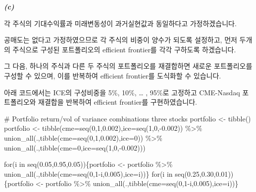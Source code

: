 \documentclass[
  letterpaper,
  DIV=11,
  numbers=noendperiod]{scrreprt}
\newenvironment{Shaded}{\begin{snugshade}}{\end{snugshade}}
\newcommand{\AttributeTok}[1]{\textcolor[rgb]{0.40,0.45,0.13}{#1}}
\newcommand{\CommentTok}[1]{\textcolor[rgb]{0.37,0.37,0.37}{#1}}
\newcommand{\ControlFlowTok}[1]{\textcolor[rgb]{0.00,0.23,0.31}{#1}}
\newcommand{\DecValTok}[1]{\textcolor[rgb]{0.68,0.00,0.00}{#1}}
\newcommand{\FloatTok}[1]{\textcolor[rgb]{0.68,0.00,0.00}{#1}}
\newcommand{\FunctionTok}[1]{\textcolor[rgb]{0.28,0.35,0.67}{#1}}
\newcommand{\NormalTok}[1]{\textcolor[rgb]{0.00,0.23,0.31}{#1}}
\newcommand{\OtherTok}[1]{\textcolor[rgb]{0.00,0.23,0.31}{#1}}
\newcommand{\SpecialCharTok}[1]{\textcolor[rgb]{0.37,0.37,0.37}{#1}}
\begin{document}
\textbf{\emph{(c)}}

각 주식의 기대수익률과 미래변동성이 과거실현값과 동일하다고
가정하겠습니다.

공매도는 없다고 가정하였으므로 각 주식의 비중이 양수가 되도록 설정하고,
먼저 두개의 주식으로 구성된 포트폴리오의 efficient frontier를 각각
구하도록 하겠습니다.

그 다음, 하나의 주식과 다른 두 주식의 포트폴리오를 재결합하면 새로운
포트폴리오를 구성할 수 있으며, 이를 반복하여 efficient frontier를
도식화할 수 있습니다.

아래 코드에서는 ICE의 구성비중을 5\%, 10\%, \ldots{} , 95\%로 고정하고
CME-Nasdaq 포트폴리오와 재결합을 반복하여 efficient frontier를
구현하였습니다.

\begin{Shaded}
\begin{Highlighting}[]
\CommentTok{\# Portfolio return/vol of variance combinations three stocks}
\NormalTok{portfolio }\OtherTok{\textless{}{-}} \FunctionTok{tibble}\NormalTok{()}
\NormalTok{portfolio }\OtherTok{\textless{}{-}} \FunctionTok{tibble}\NormalTok{(}\AttributeTok{cme=}\FunctionTok{seq}\NormalTok{(}\DecValTok{0}\NormalTok{,}\DecValTok{1}\NormalTok{,}\FloatTok{0.002}\NormalTok{),}\AttributeTok{ice=}\FunctionTok{seq}\NormalTok{(}\DecValTok{1}\NormalTok{,}\DecValTok{0}\NormalTok{,}\SpecialCharTok{{-}}\FloatTok{0.002}\NormalTok{)) }\SpecialCharTok{\%\textgreater{}\%} 
  \FunctionTok{union\_all}\NormalTok{(.,}\FunctionTok{tibble}\NormalTok{(}\AttributeTok{cme=}\FunctionTok{seq}\NormalTok{(}\DecValTok{0}\NormalTok{,}\DecValTok{1}\NormalTok{,}\FloatTok{0.002}\NormalTok{),}\AttributeTok{ice=}\DecValTok{0}\NormalTok{)) }\SpecialCharTok{\%\textgreater{}\%} 
  \FunctionTok{union\_all}\NormalTok{(.,}\FunctionTok{tibble}\NormalTok{(}\AttributeTok{cme=}\DecValTok{0}\NormalTok{,}\AttributeTok{ice=}\FunctionTok{seq}\NormalTok{(}\DecValTok{1}\NormalTok{,}\DecValTok{0}\NormalTok{,}\SpecialCharTok{{-}}\FloatTok{0.002}\NormalTok{)))}

\ControlFlowTok{for}\NormalTok{(i }\ControlFlowTok{in} \FunctionTok{seq}\NormalTok{(}\FloatTok{0.05}\NormalTok{,}\FloatTok{0.95}\NormalTok{,}\FloatTok{0.05}\NormalTok{))\{portfolio }\OtherTok{\textless{}{-}}\NormalTok{ portfolio }\SpecialCharTok{\%\textgreater{}\%}
  \FunctionTok{union\_all}\NormalTok{(.,}\FunctionTok{tibble}\NormalTok{(}\AttributeTok{cme=}\FunctionTok{seq}\NormalTok{(}\DecValTok{0}\NormalTok{,}\DecValTok{1}\SpecialCharTok{{-}}\NormalTok{i,}\FloatTok{0.005}\NormalTok{),}\AttributeTok{ice=}\NormalTok{i))\}}
\ControlFlowTok{for}\NormalTok{(i }\ControlFlowTok{in} \FunctionTok{seq}\NormalTok{(}\FloatTok{0.25}\NormalTok{,}\FloatTok{0.30}\NormalTok{,}\FloatTok{0.01}\NormalTok{))\{portfolio }\OtherTok{\textless{}{-}}\NormalTok{ portfolio }\SpecialCharTok{\%\textgreater{}\%}
  \FunctionTok{union\_all}\NormalTok{(.,}\FunctionTok{tibble}\NormalTok{(}\AttributeTok{cme=}\FunctionTok{seq}\NormalTok{(}\DecValTok{0}\NormalTok{,}\DecValTok{1}\SpecialCharTok{{-}}\NormalTok{i,}\FloatTok{0.005}\NormalTok{),}\AttributeTok{ice=}\NormalTok{i))\}}


\end{Highlighting}
\end{Shaded}
\end{document}
